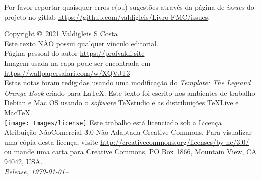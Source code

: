 \newpage
\noindent Por favor reportar quaisquer erros e(ou) sugestões através da página de \textit{issues} do projeto no gitlab \url{https://github.com/valdigleis/Livro-FMC/issues}.
~\vfill
\thispagestyle{empty}

\noindent Copyright \copyright\ 2021 Valdigleis S Costa\\ %

\noindent Este texto  \textsc{NÃO}  possui qualquer vínculo editorial.\\ %

\noindent Página pessoal do autor \url{https://profvaldi.site}\\ 

\noindent Imagem usada na capa pode ser encontrada em \url{https://wallpapersafari.com/w/XQVJT3}\\

\noindent Estas notas foram redigidas usando uma modificação do \textit{Template: 	
The Legrand Orange Book} criado para \LaTeX. Este texto foi escrito nos ambientes de trabalho Debian e Mac OS usando o \textit{software} TeXstudio e as distribuições TeXLive e MacTeX. \\ 

\noindent \texttt{[image: Images/license]}  Este trabalho está licenciado sob a Licença Atribuição-NãoComercial 3.0 Não Adaptada Creative Commons. Para visualizar uma cópia desta licença, visite \url{http://creativecommons.org/licenses/by-nc/3.0/} ou mande uma carta para Creative Commons, PO Box 1866, Mountain View, CA 94042, USA.\\


\noindent \textit{Release, \today--\currenttime} %